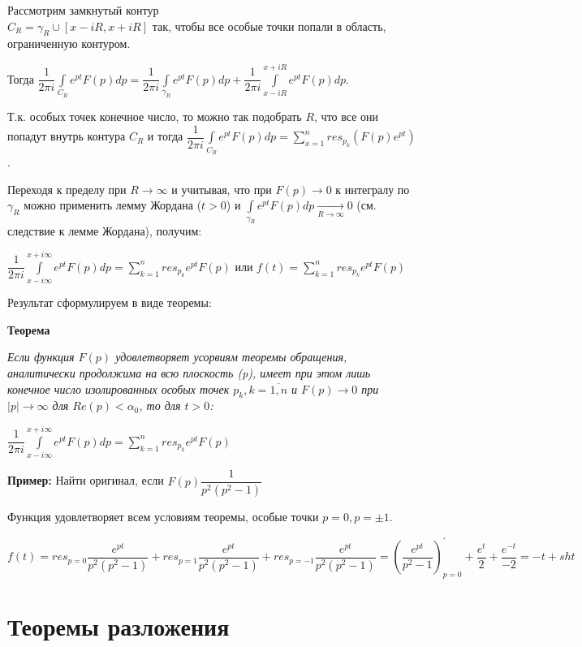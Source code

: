 \documentclass[a4paper, 12pt]{report}
\begin{document}
Рассмотрим замкнутый контур \\$C_R = \gamma_R \cup [x - iR, x + iR]$ так, чтобы все особые точки попали в область, ограниченную контуром. 
\par\bigskip
Тогда $\dfrac{1}{2 \pi i} \int\limits_{C_R}e^{pt}F(p)dp = \dfrac{1}{2 \pi i}\int\limits_{\gamma_R}e^{pt}F(p)dp + \dfrac{1}{2 \pi i}\int\limits_{x - iR}^{x + iR}e^{pt}F(p)dp$.
\par\bigskip
Т.к. особых точек конечное число, то можно так подобрать $R$, что все они попадут внутрь контура $C_R$ и тогда $\dfrac{1}{2 \pi i} \int\limits_{C_R}e^{pt}F(p)dp = \sum\limits_{x=1}^{n}res_{p_k}(F(p)e^{pt})$. 
\par\bigskip
Переходя к пределу при $R \rightarrow \infty$ и учитывая, что при $F(p) \rightarrow 0$ к интегралу по $\gamma_R$ можно применить лемму Жордана ($t > 0$) и $\int\limits_{\gamma_R}e^{pt}F(p)dp \xrightarrow[R \rightarrow \infty]{} 0$ (см. следствие к лемме Жордана), получим:

\begin{center}
    $\dfrac{1}{2 \pi i}\int\limits_{x - i\infty}^{x + i\infty} e^{pt}F(p)dp = \sum\limits_{k=1}^n res_{p_k}e^{pt}F(p)$ или $f(t) = \sum\limits_{k=1}^n res_{p_k}e^{pt}F(p)$
\end{center}

Результат сформулируем в виде теоремы:

\textbf{Теорема}

\textit{Если функция $F(p)$ удовлетворяет усорвиям теоремы обращения, аналитически продолжима на всю плоскость (p), имеет при этом лишь конечное число изолированных особых точек $p_k, k = \overline{1, n}$ и $F(p) \rightarrow 0$ при $|p| \rightarrow \infty$ для $Re(p) < \alpha_0$, то для $t > 0$:}

\begin{center}
    $\dfrac{1}{2 \pi i}\int\limits_{x - i\infty}^{x + i\infty} e^{pt}F(p)dp = \sum\limits_{k=1}^n res_{p_k}e^{pt}F(p)$
\end{center}

\textbf{Пример:} Найти оригинал, если $F(p) \dfrac{1}{p^2(p^2 - 1)}$
\par\bigskip
Функция удовлетворяет всем условиям теоремы, особые точки $p = 0, p = \pm1$.

$f(t) = res_{p=0}\dfrac{e^{pt}}{p^2(p^2 - 1)} + res_{p=1}\dfrac{e^{pt}}{p^2(p^2 - 1)} + res_{p=-1}\dfrac{e^{pt}}{p^2(p^2 - 1)} = (\dfrac{e^{pt}}{p^2 - 1})_{p=0}^{'} + \dfrac{e^t}{2} + \dfrac{e^{-t}}{-2} = -t + sht$

\section{Теоремы разложения}
\end{document}
